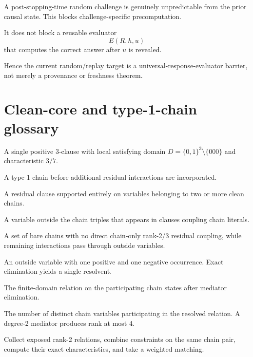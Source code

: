 \documentclass[11pt]{article}
\theoremstyle{plain}
\theoremstyle{definition}
\theoremstyle{remark}
\begin{document}
A post-stopping-time random challenge is genuinely unpredictable from the
prior causal state. This blocks challenge-specific precomputation.

It does not block a reusable evaluator
\[
E(R,h,u)
\]
that computes the correct answer after $u$ is revealed.

Hence the current random/replay target is a universal-response-evaluator
barrier, not merely a provenance or freshness theorem.

\section{Clean-core and type-1-chain glossary}

\begin{description}[leftmargin=1.9em,style=nextline]
\item[Type-1 chain]
A single positive 3-clause with local satisfying domain
$D=\{0,1\}^3\setminus\{000\}$ and characteristic $3/7$.

\item[Bare chain]
A type-1 chain before additional residual interactions are incorporated.

\item[Direct correlation]
A residual clause supported entirely on variables belonging to two or more
clean chains.

\item[Outside mediator]
A variable outside the chain triples that appears in clauses coupling chain
literals.

\item[Externally mediated clean core]
A set of bare chains with no direct chain-only rank-2/3 residual coupling,
while remaining interactions pass through outside variables.

\item[Degree-2 mediator]
An outside variable with one positive and one negative occurrence. Exact
elimination yields a single resolvent.

\item[Resolved relation]
The finite-domain relation on the participating chain states after mediator
elimination.

\item[Rank]
The number of distinct chain variables participating in the resolved relation.
A degree-2 mediator produces rank at most 4.

\item[RESOLVE-MATCH]
Collect exposed rank-2 relations, combine constraints on the same chain pair,
compute their exact characteristics, and take a weighted matching.


\end{description}
\end{document}
